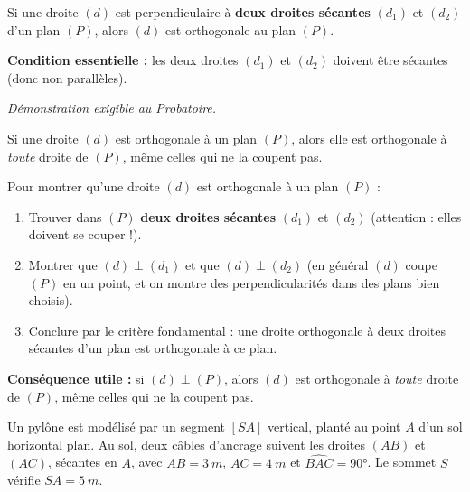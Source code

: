 \documentclass[11pt]{article}
\newcommand{\cle}[1]{{\popxbold\color{popdark}#1}}
\begin{document}
\begin{propriete}
Si une droite $(d)$ est perpendiculaire à \textbf{deux droites sécantes} $(d_1)$ et $(d_2)$ d'un plan $(P)$, alors $(d)$ est orthogonale au plan $(P)$.
\par
\textbf{Condition essentielle :} les deux droites $(d_1)$ et $(d_2)$ doivent être \cle{sécantes} (donc non parallèles).
\par
\textit{Démonstration exigible au Probatoire.}
\end{propriete}

\begin{propriete}
Si une droite $(d)$ est orthogonale à un plan $(P)$, alors elle est orthogonale à \emph{toute} droite de $(P)$, même celles qui ne la coupent pas.
\end{propriete}

\begin{methode}
Pour montrer qu'une droite $(d)$ est orthogonale à un plan $(P)$ :
\begin{enumerate}
\item Trouver dans $(P)$ \textbf{deux droites sécantes} $(d_1)$ et $(d_2)$ (attention : elles doivent se couper !).
\item Montrer que $(d) \perp (d_1)$ et que $(d) \perp (d_2)$ (en général $(d)$ coupe $(P)$ en un point, et on montre des perpendicularités dans des plans bien choisis).
\item Conclure par le \cle{critère fondamental} : une droite orthogonale à deux droites sécantes d'un plan est orthogonale à ce plan.
\end{enumerate}
\textbf{Conséquence utile :} si $(d) \perp (P)$, alors $(d)$ est orthogonale à \emph{toute} droite de $(P)$, même celles qui ne la coupent pas.
\end{methode}

\begin{exemplebox}
Un pylône est modélisé par un segment $[SA]$ vertical, planté au point $A$ d'un sol horizontal plan. Au sol, deux câbles d'ancrage suivent les droites $(AB)$ et $(AC)$, sécantes en $A$, avec $AB = \SI{3}{m}$, $AC = \SI{4}{m}$ et $\widehat{BAC} = 90°$. Le sommet $S$ vérifie $SA = \SI{5}{m}$.
\end{exemplebox}
\end{document}
